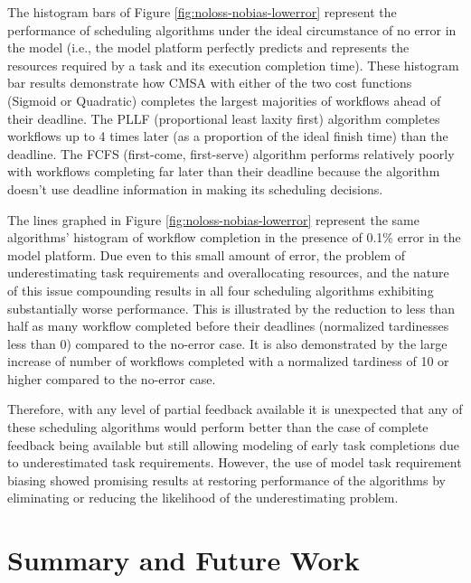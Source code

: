 \documentclass[10pt]{csce}
\begin{document}
The histogram bars of Figure \ref{fig:noloss-nobias-lowerror} represent the
performance of scheduling algorithms under the ideal circumstance of no error
in the model (i.e., the model platform perfectly predicts and represents the
resources required by a task and its execution completion time).  These
histogram bar results demonstrate how CMSA with either of the two
cost functions (Sigmoid or Quadratic) completes the largest majorities of
workflows ahead of their deadline.  The PLLF (proportional least laxity first)
algorithm completes workflows up to 4 times later (as a proportion of the
ideal finish time) than the deadline. The FCFS (first-come, first-serve)
algorithm performs relatively poorly with workflows completing far later than
their deadline because the algorithm doesn't use deadline information in making
its scheduling decisions.

The lines graphed in Figure \ref{fig:noloss-nobias-lowerror} represent the
same algorithms' histogram of workflow completion in the presence of 0.1\% error
in the model platform.  Due even to this small amount of error, the problem of
underestimating task requirements and overallocating resources, and the nature
of this issue compounding results in all four scheduling algorithms exhibiting
substantially worse performance.  This is illustrated by the reduction to less
than half as many workflow completed before their deadlines (normalized
tardinesses less than 0) compared to the no-error case.  It is also
demonstrated by the large increase of number of workflows completed with a
normalized tardiness of 10 or higher compared to the no-error case.

Therefore, with any level of partial feedback available it is unexpected that
any of these scheduling algorithms would perform better than the case of
complete feedback being available but still allowing modeling of early task
completions due to underestimated task requirements.  However, the use of
model task requirement biasing showed promising results at restoring
performance of the algorithms by eliminating or reducing the likelihood of
the underestimating problem.




\section{Summary and Future Work}
\label{sec:Summary}



{}

\end{document}
